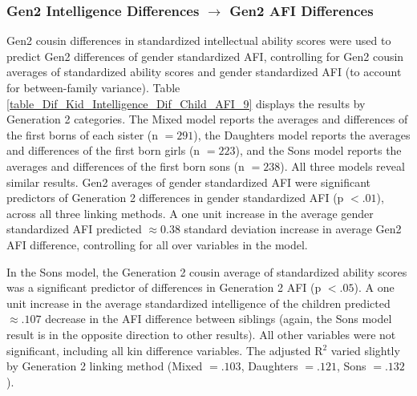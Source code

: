 \subsubsection{Gen2 Intelligence Differences $\rightarrow$ Gen2 AFI Differences}
Gen2 cousin differences in standardized intellectual ability scores were used to predict Gen2 differences of gender standardized AFI, controlling for Gen2 cousin averages of standardized ability scores and gender standardized AFI (to account for between-family variance). Table \ref{table_Dif_Kid_Intelligence_Dif_Child_AFI_9} displays the results by Generation 2 categories. The Mixed model reports the averages and differences of the first borns of each sister (n $= 291$), the Daughters model reports the averages and differences of the first born girls (n $= 223$), and the Sons model reports the averages and differences of the first born sons (n $= 238$). All three models reveal similar results. Gen2 averages of gender standardized AFI were significant predictors of Generation 2 differences in gender standardized AFI (p $< .01$), across all three linking methods. A one unit increase in the average gender standardized AFI predicted $\approx 0.38$ standard deviation increase in average Gen2 AFI difference, controlling for all over variables in the model. 

In the Sons model, the Generation 2 cousin average of standardized ability scores was a significant predictor of differences in Generation 2 AFI (p $< .05$). A one unit increase in the average standardized intelligence of the children predicted $\approx .107$ decrease in the AFI difference between siblings (again, the Sons model result is in the opposite direction to other results). All other variables were not significant, including all kin difference variables. The adjusted R$^{2}$ varied slightly by Generation 2 linking method (Mixed $= .103$, Daughters $= .121$, Sons $= .132$).

